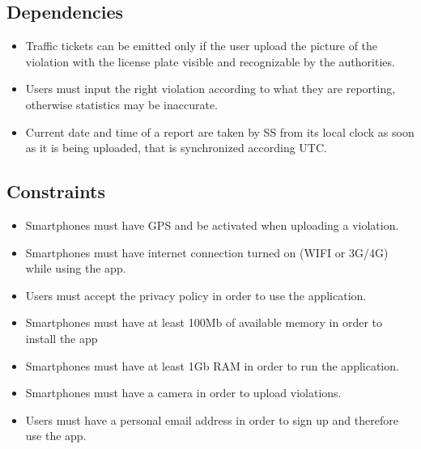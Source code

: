 \documentclass[../RASD.tex]{subfiles}
\begin{document}
    \subsection{Dependencies}\label{subsec:dependencies}
    \begin{itemize}
        \item Traffic tickets can be emitted only if the user upload the picture of the violation with the license plate visible and recognizable by the authorities.
        \item Users must input the right violation according to what they are reporting, otherwise statistics may be inaccurate.
        \item Current date and time of a report are taken by SS from its local clock as soon as it is being uploaded, that is synchronized according UTC.
    \end{itemize}
    \subsection{Constraints}\label{subsec:constraints}
    \begin{itemize}
        \item Smartphones must have GPS and be activated when uploading a violation.
        \item Smartphones must have internet connection turned on (WIFI or 3G/4G) while using the app.
        \item Users must accept the privacy policy in order to use the application.
        \item Smartphones must have at least 100Mb of available memory in order to install the app
        \item Smartphones must have at least 1Gb RAM in order to run the application.
        \item Smartphones must have a camera in order to upload violations.
        \item Users must have a personal email address in order to sign up and therefore use the app.
    \end{itemize}
\end{document}
